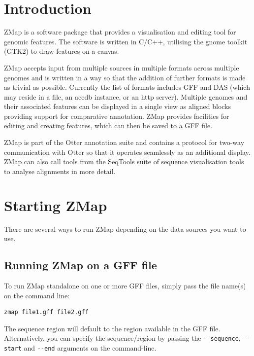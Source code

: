 \documentclass[letterpaper]{article}
\begin{document}
\setcounter{tocdepth}{10}
\renewcommand\contentsname{Contents}

\clearpage\tableofcontents

\clearpage
\section{Introduction}

ZMap is a software package that provides a visualisation and editing tool for genomic features. The software is written in C/C++, utilising the gnome toolkit (GTK2) to draw features on a canvas.

ZMap accepts input from multiple sources in multiple formats across multiple genomes and is written in a way so that the addition of further formats is made as trivial as possible. Currently the list of formats includes GFF and DAS (which may reside in a file, an acedb instance, or an http server). Multiple genomes and their associated features can be displayed in a single view as aligned blocks providing support for comparative annotation. ZMap provides facilities for editing and creating features, which can then be saved to a GFF file.

ZMap is part of the Otter annotation suite and contains a protocol for two-way communication with Otter so that it operates seamlessly as an additional display. ZMap can also call tools from the SeqTools suite of sequence visualisation tools to analyse alignments in more detail.

\clearpage
\section{Starting ZMap}
There are several ways to run ZMap depending on the data sources you want to use.

\subsection{Running ZMap on a GFF file}
To run ZMap standalone on one or more GFF files, simply pass the file name(s) on the command line:
\begin{lstlisting}
zmap file1.gff file2.gff
\end{lstlisting}

The sequence region will default to the region available in the GFF file. Alternatively, you can specify the sequence/region by passing the \lstinline{--sequence}, \lstinline{--start} and \lstinline{--end} arguments on the command-line.
\end{document}

